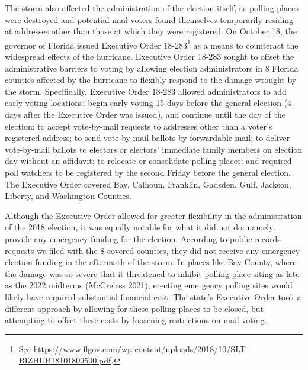 \documentclass[
  12pt,
]{article}
\begin{document}
The storm also affected the administration of the election itself, as polling places were destroyed and potential mail voters found themselves temporarily residing at addresses other than those at which they were registered. On October 18, the governor of Florida issued Executive Order 18-283\footnote{See \url{https://www.flgov.com/wp-content/uploads/2018/10/SLT-BIZHUB18101809500.pdf}.} as a means to counteract the widespread effects of the hurricane. Executive Order 18-283 sought to offset the administrative barriers to voting by allowing election administrators in 8 Florida counties affected by the hurricane to flexibly respond to the damage wrought by the storm. Specifically, Executive Order 18-283 allowed administrators to add early voting locations; begin early voting 15 days before the general election (4 days after the Executive Order was issued), and continue until the day of the election; to accept vote-by-mail requests to addresses other than a voter's registered address; to send vote-by-mail ballots by forwardable mail; to deliver vote-by-mail ballots to electors or electors' immediate family members on election day without an affidavit; to relocate or consolidate polling places; and required poll watchers to be registered by the second Friday before the general election. The Executive Order covered Bay, Calhoun, Franklin, Gadsden, Gulf, Jackson, Liberty, and Washington Counties.

Although the Executive Order allowed for greater flexibility in the administration of the 2018 election, it was equally notable for what it did not do: namely, provide any emergency funding for the election. According to public records requests we filed with the 8 covered counties, they did not receive any emergency election funding in the aftermath of the storm. In places like Bay County, where the damage was so severe that it threatened to inhibit polling place siting as late as the 2022 midterms (\protect\hyperlink{ref-McCreless2021}{McCreless 2021}), erecting emergency polling sites would likely have required substantial financial cost. The state's Executive Order took a different approach by allowing for these polling places to be closed, but attempting to offset these costs by loosening restrictions on mail voting.
\end{document}
